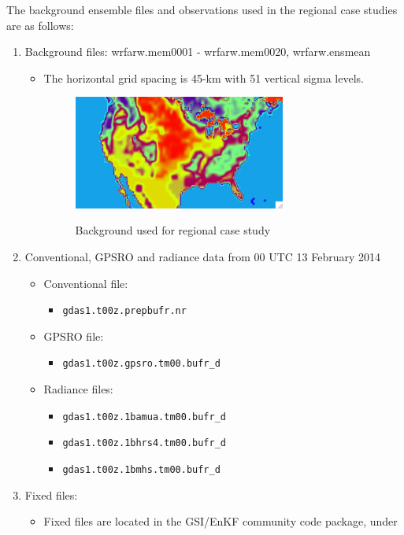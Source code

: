 The background ensemble files and observations used in the regional case studies are as follows:
\begin{enumerate}
\item Background files: wrfarw.mem0001 - wrfarw.mem0020, wrfarw.ensmean
\begin{itemize}
\item The horizontal grid spacing is 45-km with 51 vertical sigma levels.
\begin{figure}[h!]
  \centering
  \caption{Background used for regional case study}
  \includegraphics[width=0.7\textwidth]{images/ch5_figure1.jpg} 
 \label{ch5_fig1}
\end{figure}
\end{itemize}
\item Conventional, GPSRO and radiance data from 00 UTC 13 February 2014
\begin{itemize}
\item Conventional file:  
\begin{itemize}
\item \verb|gdas1.t00z.prepbufr.nr|
\end{itemize}
\item GPSRO file: 
\begin{itemize}
\item \verb|gdas1.t00z.gpsro.tm00.bufr_d| 
\end{itemize}
\item Radiance files: 
\begin{itemize}
\item \verb|gdas1.t00z.1bamua.tm00.bufr_d| 
\item \verb|gdas1.t00z.1bhrs4.tm00.bufr_d| 
\item \verb|gdas1.t00z.1bmhs.tm00.bufr_d| 
\end{itemize}
\end{itemize}
\item Fixed files:
\begin{itemize}
\item Fixed files are located in the GSI/EnKF community code package, under

\end{itemize}
\end{enumerate}
